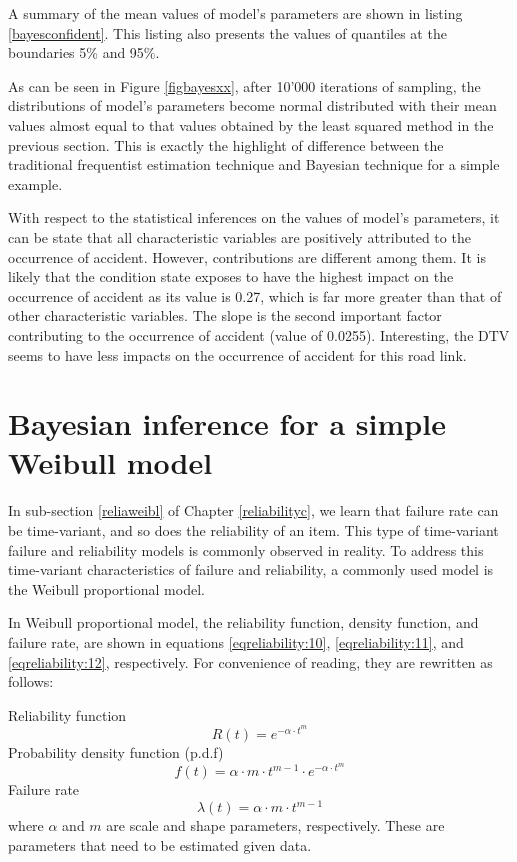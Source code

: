 A summary of the mean values of model's parameters are shown in listing \ref{bayesconfident}. This listing also presents the values of quantiles at the boundaries 5\% and 95\%. 



As can be seen in Figure \ref{figbayesxx}, after 10'000 iterations of sampling, the distributions of model's parameters become normal distributed with their mean values almost equal to that values obtained by the least squared method in the previous section. This is exactly the highlight of difference between the traditional frequentist estimation technique and Bayesian technique for a simple example. 

With respect to the statistical inferences on the values of model's parameters, it can be state that all characteristic variables are positively attributed to the occurrence of accident. However, contributions are different among them. It is likely that the condition state exposes to have the highest impact on the occurrence of accident as its value is 0.27, which is far more greater than that of other characteristic variables. The slope is the second important factor contributing to the occurrence of accident (value of 0.0255). Interesting, the DTV seems to have less impacts on the occurrence of accident for this road link. 
%
\section{Bayesian inference for a simple Weibull model} \label{bayweil}
In sub-section \ref{reliaweibl} of Chapter \ref{reliabilityc}, we learn that failure rate can be time-variant, and so does the reliability of an item. This type of time-variant failure and reliability models is commonly observed in reality. To address this time-variant characteristics of failure and reliability, a commonly used model is the Weibull proportional model. 

In Weibull proportional model, the reliability function, density function, and failure rate, are shown in equations \eqref{eqreliability:10}, \eqref{eqreliability:11}, and \eqref{eqreliability:12}, respectively. For convenience of reading, they are rewritten as follows:

Reliability function
\[
 R(t) = {e^{ - {\alpha \cdot t^m}}}
\]
Probability density function (p.d.f)
\[
 f(t) = \alpha  \cdot m \cdot {t^{m - 1}} \cdot {e^{ - {\alpha \cdot {t}^m}}}
\]
Failure rate
\[
 \lambda (t) = \alpha  \cdot m \cdot {t^{m - 1}}
\]
where $\alpha $ and $m$ are scale and shape parameters, respectively. These are parameters that need to be estimated given data.
%
